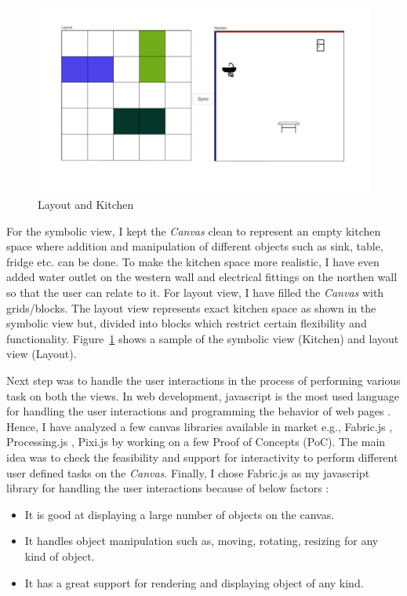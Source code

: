 \begin{figure}
	\includegraphics[width=1\textwidth]{figures/Layout_Kitchen}
	\caption{Layout and Kitchen}
	\label{fig:Layout_Kitchen}
\end{figure}

For the symbolic view, I kept the \textit{Canvas} clean to represent an empty kitchen space where addition and manipulation of different objects such as sink, table, fridge etc. can be done. To make the kitchen space more realistic, I have even added {\color{blue} water outlet} on the western wall and {\color{red} electrical fittings} on the northen wall so that the user can relate to it. For layout view, I have filled the \textit{Canvas} with grids/blocks. The layout view represents exact kitchen space as shown in the symbolic view but, divided into blocks which restrict certain flexibility and functionality. Figure~\ref{fig:Layout_Kitchen} shows a sample of the symbolic view (Kitchen) and layout view (Layout).

Next step was to handle the user interactions in the process of performing various task on both the views. In web development, javascript is the most used language for handling the user interactions and programming the behavior of web pages \cite{javascript}. Hence, I have analyzed a few canvas libraries available in market e.g., Fabric.js \cite{fabricjs}, Processing.js \cite{processingjs}, Pixi.js \cite{pixijs}  by working on a few Proof of Concepts (PoC). The main idea was to check the feasibility and support for interactivity to perform different user defined tasks on the \textit{Canvas}. Finally, I chose Fabric.js as my javascript library for handling the user interactions because of below factors \cite{fabricjs}:
\begin{itemize}
	\item {It is good at displaying a large number of objects on the canvas.}
	\item {It handles object manipulation such as, moving, rotating, resizing for any kind of object.}
	\item {It has a great support for rendering and displaying object of any kind.}
\end{itemize}

